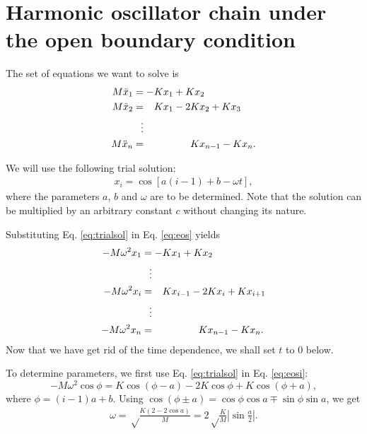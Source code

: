 \documentclass[11pt]{article}
\begin{document}
\section{Harmonic oscillator chain under the open boundary condition }



The set of equations we want to solve is
\begin{equation}
\begin{split}
M \ddot x_1 &= -K x_1 + K x_2 \\
M \ddot x_2 &= \hphantom{-}  K x_1 - 2 K x_2   + K x_3 \\
            &\hphantom{-} \vdots \\
M \ddot x_n &= \hphantom{-K x_1 -2}        K x_{n-1}  - K x_n.
\end{split}
\label{eq:eos}
\end{equation}


We will use the following trial solution:
\begin{align}
  x_i = \cos[a (i - 1) + b - \omega t],
  \label{eq:trialsol}
\end{align}
where the parameters $a$, $b$ and $\omega$ are to be determined.
Note that the solution can be multiplied by an arbitrary constant $c$
without changing its nature.



Substituting Eq. \eqref{eq:trialsol} in Eq. \eqref{eq:eos} yields
\begin{align}
-M \omega^2 x_1 &= -K x_1 + K x_2 \label{eq:eos1} \\
                &\hphantom{-} \vdots \notag \\
-M \omega^2 x_i &= \hphantom{-}  K x_{i-1} - 2 K x_i + K x_{i+1}
  \label{eq:eosi} \\
                &\hphantom{-} \vdots \notag \\
-M \omega^2 x_n &= \hphantom{-K x_1 -2}        K x_{n-1}  - K x_n.
  \label{eq:eosn}
\end{align}
Now that we have get rid of the time dependence,
we shall set $t$ to 0 below.

To determine parameters,
we first use Eq. \eqref{eq:trialsol} in Eq. \eqref{eq:eosi}:
\[
-M \omega^2 \cos\phi
=
K \cos(\phi - a)
-2 K \cos\phi
+K \cos(\phi + a),
\]
where $\phi = (i-1)a + b$.
Using $\cos(\phi \pm a) = \cos\phi \cos a \mp \sin\phi \sin a$, we get
\begin{align}
\omega
=
\sqrt \frac { K (2 - 2 \cos a) } M
=
2 \sqrt \frac K M \left| \sin \frac a 2 \right|.
\label{eq:omega_a}
\end{align}
\end{document}
